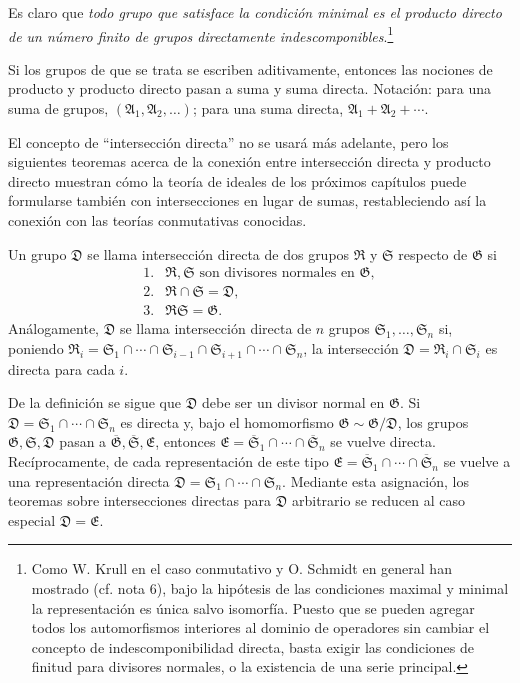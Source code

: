 \documentclass[11pt]{article}
\providecommand{\mG}{\mathfrak{G}}
\providecommand{\mA}{\mathfrak{A}}
\providecommand{\mD}{\mathfrak{D}}
\providecommand{\mE}{\mathfrak{E}}
\providecommand{\mR}{\mathfrak{R}}
\providecommand{\mS}{\mathfrak{S}}
\begin{document}
Es claro que \emph{todo grupo que satisface la condición minimal es el producto directo de un número finito de grupos directamente indescomponibles}.\footnote{Como W. Krull en el caso conmutativo y O. Schmidt en general han mostrado (cf. nota 6), bajo la hipótesis de las condiciones maximal y minimal la representación es única salvo isomorfía. Puesto que se pueden agregar todos los automorfismos interiores al dominio de operadores sin cambiar el concepto de indescomponibilidad directa, basta exigir las condiciones de finitud para divisores normales, o la existencia de una serie principal.}

Si los grupos de que se trata se escriben aditivamente, entonces las nociones de producto y producto directo pasan a suma y suma directa. Notación: para una suma de grupos, $(\mA_1,\mA_2,\ldots)$; para una suma directa, $\mA_1+\mA_2+\cdots$.

El concepto de ``intersección directa'' no se usará más adelante, pero los siguientes teoremas acerca de la conexión entre intersección directa y producto directo muestran cómo la teoría de ideales de los próximos capítulos puede formularse también con intersecciones en lugar de sumas, restableciendo así la conexión con las teorías conmutativas conocidas.

Un grupo $\mD$ se llama intersección directa de dos grupos $\mR$ y $\mS$ respecto de $\mG$ si
\[
\begin{array}{ll}
1.& \mR,\mS\text{ son divisores normales en }\mG,\\
2.& \mR\cap\mS=\mD,\\
3.& \mR\mS=\mG.
\end{array}
\]
Análogamente, $\mD$ se llama intersección directa de $n$ grupos $\mS_1,\ldots,\mS_n$ si, poniendo $\mR_i=\mS_1\cap\cdots\cap\mS_{i-1}\cap\mS_{i+1}\cap\cdots\cap\mS_n$, la intersección $\mD=\mR_i\cap\mS_i$ es directa para cada $i$.

De la definición se sigue que $\mD$ debe ser un divisor normal en $\mG$. Si $\mD=\mS_1\cap\cdots\cap\mS_n$ es directa y, bajo el homomorfismo $\mG\sim\mG/\mD$, los grupos $\mG,\mS,\mD$ pasan a $\overline{\mG},\overline{\mS},\mE$, entonces $\mE=\overline{\mS}_1\cap\cdots\cap\overline{\mS}_n$ se vuelve directa. Recíprocamente, de cada representación de este tipo $\mE=\overline{\mS}_1\cap\cdots\cap\overline{\mS}_n$ se vuelve a una representación directa $\mD=\mS_1\cap\cdots\cap\mS_n$. Mediante esta asignación, los teoremas sobre intersecciones directas para $\mD$ arbitrario se reducen al caso especial $\mD=\mE$.
\end{document}
